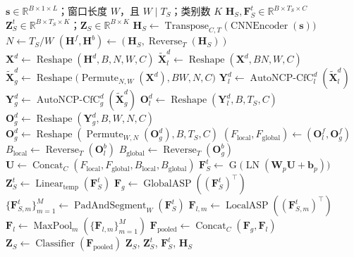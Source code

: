 \documentclass[a4paper, 12pt]{article}
\begin{document}
\begin{algorithm}[!t]
\caption{面向水声目标识别的 BiTAL 学生网络}
\label{alg:student_network}
\begin{algorithmic}[1]
\Require $\mathbf{s}\in\mathbb{R}^{B\times 1\times L}$；窗口长度 $W$，且 $W\mid T_S$；类别数 $K$
\Ensure $\mathbf{H}_S,\mathbf{F}_S^t\in\mathbb{R}^{B\times T_S\times C}$
\Ensure $\mathbf{Z}_S^t\in\mathbb{R}^{B\times T_S\times K}$；$\mathbf{Z}_S\in\mathbb{R}^{B\times K}$
\State $\mathbf{H}_S \gets \operatorname{Transpose}_{C,T}\big(\operatorname{CNNEncoder}(\mathbf{s})\big)$
\State $N \gets T_S/W$
\State $(\mathbf{H}^{f},\mathbf{H}^{b}) \gets (\mathbf{H}_S,\operatorname{Reverse}_{T}(\mathbf{H}_S))$
 
    \State $\mathbf{X}^{d} \gets \operatorname{Reshape}(\mathbf{H}^{d},B,N,W,C)$
    \State $\tilde{\mathbf{X}}_{l}^{d} \gets \operatorname{Reshape}(\mathbf{X}^{d},B N,W,C)$
    \State $\tilde{\mathbf{X}}_{g}^{d} \gets \operatorname{Reshape}\big(\operatorname{Permute}_{N,W}(\mathbf{X}^{d}),B W,N,C\big)$
    \State $\mathbf{Y}_{l}^{d} \gets \operatorname{AutoNCP\mbox{-}CfC}_{l}^{d}(\tilde{\mathbf{X}}_{l}^{d})$ 
    \State $\mathbf{Y}_{g}^{d} \gets \operatorname{AutoNCP\mbox{-}CfC}_{g}^{d}(\tilde{\mathbf{X}}_{g}^{d})$
    \State $\mathbf{O}_{l}^{d} \gets \operatorname{Reshape}(\mathbf{Y}_{l}^{d},B,T_S,C)$
    \State $\mathbf{O}_{g}^{d} \gets \operatorname{Reshape}(\mathbf{Y}_{g}^{d},B,W,N,C)$
    \State $\mathbf{O}_{g}^{d} \gets \operatorname{Reshape}(\operatorname{Permute}_{W,N}(\mathbf{O}_{g}^{d}),B,T_S,C)$
\EndFor
\State $(F_{\mathrm{local}},F_{\mathrm{global}}) \gets (\mathbf{O}_{l}^{f},\mathbf{O}_{g}^{f})$
\State $B_{\mathrm{local}} \gets \operatorname{Reverse}_{T}(\mathbf{O}_{l}^{b})$
\State $B_{\mathrm{global}} \gets \operatorname{Reverse}_{T}(\mathbf{O}_{g}^{b})$
\State $\mathbf{U} \gets \operatorname{Concat}_{C}(F_{\mathrm{local}},F_{\mathrm{global}},B_{\mathrm{local}},B_{\mathrm{global}})$
\State $\mathbf{F}_S^t \gets \operatorname{G}\big(\operatorname{LN}(\mathbf{W}_{p}\mathbf{U}+\mathbf{b}_{p})\big)$
\State $\mathbf{Z}_S^t \gets \operatorname{Linear}_{\mathrm{temp}}(\mathbf{F}_S^t)$ 
\State $\mathbf{F}_g \gets \operatorname{GlobalASP}((\mathbf{F}_S^t)^\top)$
\State $\{\mathbf{F}_{S,m}^t\}_{m=1}^{M} \gets \operatorname{PadAndSegment}_{W}(\mathbf{F}_S^t)$
    \State $\mathbf{F}_{l,m} \gets \operatorname{LocalASP}((\mathbf{F}_{S,m}^t)^\top)$ 
\EndFor
\State $\mathbf{F}_l \gets \operatorname{MaxPool}_{m}(\{\mathbf{F}_{l,m}\}_{m=1}^{M})$
\State $\mathbf{F}_{\mathrm{pooled}} \gets \operatorname{Concat}_{C}(\mathbf{F}_g,\mathbf{F}_l)$
\State $\mathbf{Z}_S \gets \operatorname{Classifier}(\mathbf{F}_{\mathrm{pooled}})$
\State \Return $\mathbf{Z}_S$, $\mathbf{Z}_S^t$, $\mathbf{F}_S^t$, $\mathbf{H}_S$ 
\end{algorithmic}
\end{algorithm}
\end{document}
